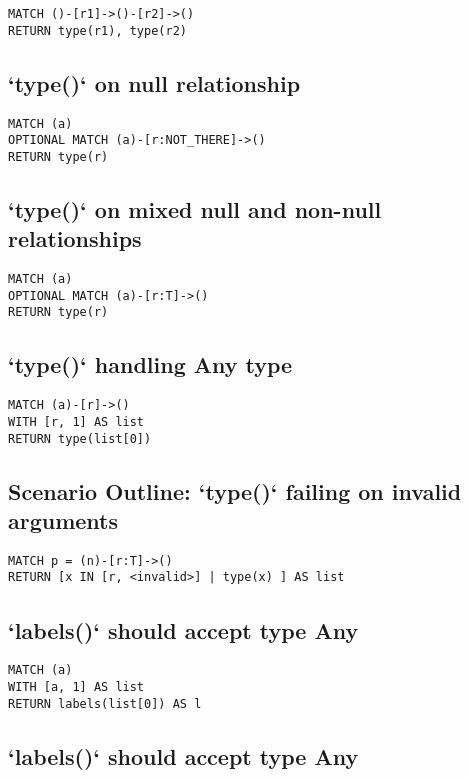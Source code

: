 \begin{lstlisting}
MATCH ()-[r1]->()-[r2]->()
RETURN type(r1), type(r2)
\end{lstlisting}

\subsection{`type()` on null relationship}

\begin{lstlisting}
MATCH (a)
OPTIONAL MATCH (a)-[r:NOT_THERE]->()
RETURN type(r)
\end{lstlisting}

\subsection{`type()` on mixed null and non-null relationships}

\begin{lstlisting}
MATCH (a)
OPTIONAL MATCH (a)-[r:T]->()
RETURN type(r)
\end{lstlisting}

\subsection{`type()` handling Any type}

\begin{lstlisting}
MATCH (a)-[r]->()
WITH [r, 1] AS list
RETURN type(list[0])
\end{lstlisting}

\subsection{Scenario Outline: `type()` failing on invalid arguments}

\begin{lstlisting}
MATCH p = (n)-[r:T]->()
RETURN [x IN [r, <invalid>] | type(x) ] AS list
\end{lstlisting}

\subsection{`labels()` should accept type Any}

\begin{lstlisting}
MATCH (a)
WITH [a, 1] AS list
RETURN labels(list[0]) AS l
\end{lstlisting}

\subsection{`labels()` should accept type Any}

